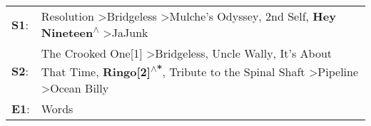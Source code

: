 \begin{supertabular}{p{0.03\textwidth}p{0.92\textwidth}}
 \textbf{S1}:  &                                                                                                                Resolution\textsuperscript{} \textgreater \enspace Bridgeless\textsuperscript{} \textgreater \enspace Mulche's Odyssey\textsuperscript{}, \enspace 2nd Self\textsuperscript{}, \enspace \textbf{Hey Nineteen\textsuperscript{$\wedge$}} \textgreater \enspace JaJunk\textsuperscript{}  \enspace  \\
 \textbf{S2}:  &  The Crooked One[1]\textsuperscript{} \textgreater \enspace Bridgeless\textsuperscript{}, \enspace Uncle Wally\textsuperscript{}, \enspace It's About That Time\textsuperscript{}, \enspace \textbf{Ringo[2]\textsuperscript{$\wedge$*}}, \enspace Tribute to the Spinal Shaft\textsuperscript{} \textgreater \enspace Pipeline\textsuperscript{} \textgreater \enspace Ocean Billy\textsuperscript{}  \enspace  \\
 \textbf{E1}:  &                                                                                                                                                                                                                                                                                                                                                                               Words\textsuperscript{}  \enspace  \\
\end{supertabular}
